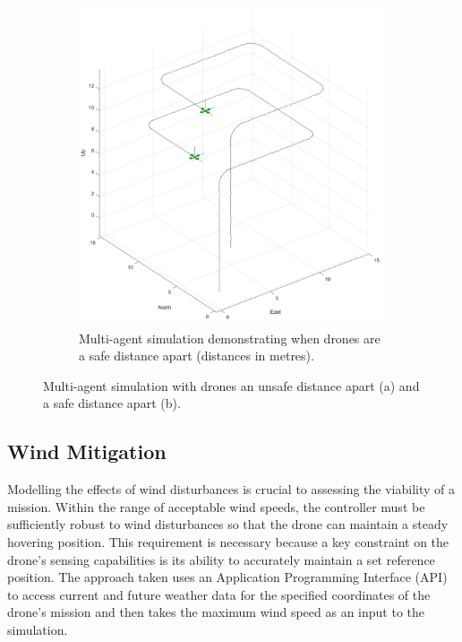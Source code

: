 \begin{figure}[H]
\begin{subfigure}[b]{0.48\textwidth}
        \includegraphics[width=\textwidth]{figs/Samuel/Figures/MultiAgentExampleGreen (2).pdf}
        \caption{Multi-agent simulation demonstrating when drones are a safe distance apart (distances in metres).}
        \label{fig:1b}
    \end{subfigure}
    \caption{Multi-agent simulation with drones an unsafe distance apart (a) and a safe distance apart (b).}
    \label{fig:dronemulti}
\end{figure}



\subsection{Wind Mitigation}
\label{gust}
Modelling the effects of wind disturbances is crucial to assessing the viability of a mission. Within the range of acceptable wind speeds, the controller must be sufficiently robust to wind disturbances so that the drone can maintain a steady hovering position. This requirement is necessary because a key constraint on the drone's sensing capabilities is its ability to accurately maintain a set reference position. The approach taken uses an Application Programming Interface (API) to access current and future weather data for the specified coordinates of the drone's mission and then takes the maximum wind speed as an input to the simulation. 

